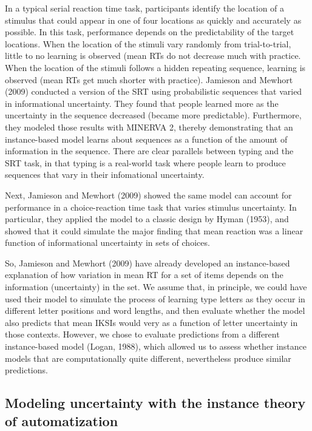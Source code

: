 \documentclass[,man,floatsintext]{apa6}
\begin{document}
In a typical serial reaction time task, participants identify the location of a stimulus that could appear in one of four locations as quickly and accurately as possible. In this task, performance depends on the predictability of the target locations. When the location of the stimuli vary randomly from trial-to-trial, little to no learning is observed (mean RTs do not decrease much with practice. When the location of the stimuli follows a hidden repeating sequence, learning is observed (mean RTs get much shorter with practice). Jamieson and Mewhort (2009) conducted a version of the SRT using probabilistic sequences that varied in informational uncertainty. They found that people learned more as the uncertainty in the sequence decreased (became more predictable). Furthermore, they modeled those results with MINERVA 2, thereby demonstrating that an instance-based model learns about sequences as a function of the amount of information in the sequence. There are clear parallels between typing and the SRT task, in that typing is a real-world task where people learn to produce sequences that vary in their infomational uncertainty.

Next, Jamieson and Mewhort (2009) showed the same model can account for performance in a choice-reaction time task that varies stimulus uncertainty. In particular, they applied the model to a classic design by Hyman (1953), and showed that it could simulate the major finding that mean reaction was a linear function of informational uncertainty in sets of choices.

So, Jamieson and Mewhort (2009) have already developed an instance-based explanation of how variation in mean RT for a set of items depends on the information (uncertainty) in the set. We assume that, in principle, we could have used their model to simulate the process of learning type letters as they occur in different letter positions and word lengths, and then evaluate whether the model also predicts that mean IKSIs would very as a function of letter uncertainty in those contexts. However, we chose to evaluate predictions from a different instance-based model (Logan, 1988), which allowed us to assess whether instance models that are computationally quite different, nevertheless produce similar predictions.

\hypertarget{modeling-uncertainty-with-the-instance-theory-of-automatization}{%
\subsection{Modeling uncertainty with the instance theory of automatization}\label{modeling-uncertainty-with-the-instance-theory-of-automatization}}
\end{document}
